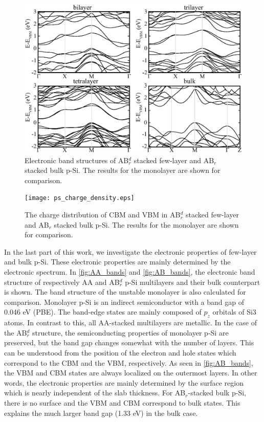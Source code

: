 \begin{figure}[htbp]
\centering
\includegraphics[width=0.8\linewidth]{ps_AB_bands.eps}%
\caption{Electronic band structures of AB$_r^d$ stacked few-layer and AB$_r$ stacked bulk p-Si. The results for the monolayer are shown for comparison.\label{fig:AB_bands}}
\end{figure} 

\begin{figure}[htbp]
\centering
\texttt{[image: ps\_charge\_density.eps]}%
\caption{The charge distribution of CBM and VBM in AB$_r^d$ stacked few-layer and AB$_r$ stacked bulk p-Si. The results for the monolayer are shown for comparison.\label{fig:charge_density}}
\end{figure}

In the last part of this work, we investigate the electronic properties of few-layer and bulk p-Si. These electronic properties are mainly determined by the electronic spectrum. In \autoref{fig:AA_bands} and \autoref{fig:AB_bands}, the electronic band structure of respectively AA and AB$_r^d$ p-Si multilayers and their bulk counterpart is shown. The band structure of the unstable monolayer is also calculated for comparison. Monolayer p-Si is an indirect semiconductor with a band gap of 0.046 eV (PBE). The band-edge states are mainly composed of $p_z$ orbitals of Si3 atoms. In contrast to this, all AA-stacked multilayers are metallic. In the case of the AB$_r^d$ structure, the semiconducting properties of monolayer p-Si are preserved, but the band gap changes somewhat with the number of layers. This can be understood from the position of the electron and hole states which correspond to the CBM and the VBM, respectively. As seen in \autoref{fig:AB_bands}, the VBM and CBM states are always localized on the outermost layers. In other words, the electronic properties are mainly determined by the surface region which is nearly independent of the slab thickness. For AB$_r$-stacked bulk p-Si, there is no surface and the VBM and CBM correspond to bulk states. This explains the much larger band gap (1.33 eV) in the bulk case. 


